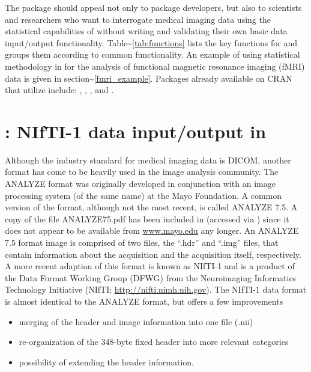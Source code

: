 \documentclass[
]{article}
\begin{document}
The  package should appeal not only to 
package developers, but also to scientists and researchers who want to
interrogate medical imaging data using the statistical capabilities of
 without writing and validating their own basic data
input/output functionality. Table\textasciitilde{}\ref{tab:functions}
lists the key functions for  and groups them according to
common functionality. An example of using statistical methodology in
 for the analysis of functional magnetic resonance imaging
(fMRI) data is given in section\textasciitilde{}\ref{fmri_example}.
Packages already available on CRAN that utilize  include:
 \citep{daSilva:JSS}, 
\citep{whi-sch:JSS},  \citep{dpmixsim}, and
 \citep{RNiftyReg}.

\section[oro.nifti: NIfTI-1 data input/output in R]{: NIfTI-1 data input/output in }

Although the industry standard for medical imaging data is DICOM,
another format has come to be heavily used in the image analysis
community. The ANALYZE format was originally developed in conjunction
with an image processing system (of the same name) at the Mayo
Foundation. A common version of the format, although not the most
recent, is called ANALYZE 7.5. A copy of the file ANALYZE75.pdf has been
included in  (accessed via
) since it
does not appear to be available from \url{www.mayo.edu} any longer. An
ANALYZE 7.5 format image is comprised of two files, the ``.hdr'' and
``.img'' files, that contain information about the acquisition and the
acquisition itself, respectively. A more recent adaption of this format
is known as NIfTI-1 and is a product of the Data Format Working Group
(DFWG) from the Neuroimaging Informatics Technology Initiative (NIfTI;
\url{http://nifti.nimh.nih.gov}). The NIfTI-1 data format is almost
identical to the ANALYZE format, but offers a few improvements

\begin{itemize}
  \item merging of the header and image information
    into one file (.nii)
  \item re-organization of the 348-byte fixed header into more
    relevant categories 
  \item possibility of extending the header information.
\end{itemize}
\end{document}
